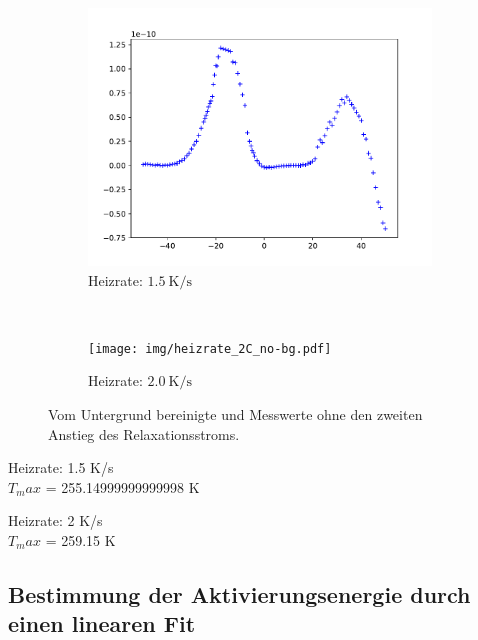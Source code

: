 \begin{figure}[htp]
    \centering
    \begin{subfigure}[t]{0.5\textwidth}
        \centering
        \includegraphics[width=\textwidth]{img/heizrate_15C_no-bg.pdf}
        \caption{Heizrate: $\SI{1.5}{\kelvin\per\second}$}
    \end{subfigure}%
    ~
    \begin{subfigure}[t]{0.5\textwidth}
        \centering
        \texttt{[image: img/heizrate\_2C\_no-bg.pdf]}
        \caption{Heizrate: $\SI{2.0}{\kelvin\per\second}$}
    \end{subfigure}
    \caption{Vom Untergrund bereinigte und Messwerte ohne den zweiten Anstieg des Relaxationsstroms.}
    \label{fig:no-bg}
\end{figure}

Heizrate: 1.5 K/s\\
$T_max$ = 255.14999999999998 K

Heizrate: 2 K/s\\
$T_max$ = 259.15 K

\subsection{Bestimmung der Aktivierungsenergie durch einen linearen Fit}

